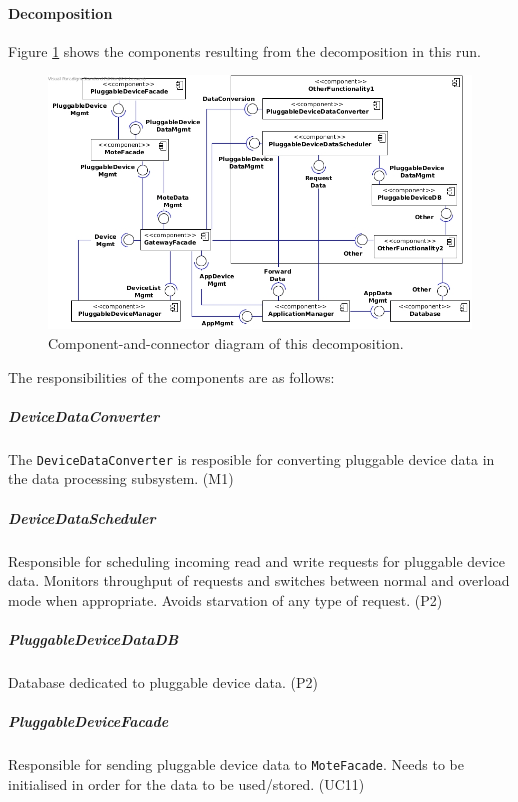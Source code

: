     \paragraph{Decomposition}
        Figure \ref{fig:it2-cc_main} shows the components resulting from the
        decomposition in this run.

        \begin{figure}[!h]
        	\centering
            \includegraphics[width=1\textwidth]{images/component-diagram-2}
        	\caption{Component-and-connector diagram of this decomposition.}
            \label{fig:it2-cc_main}
        \end{figure}

        The responsibilities of the components are as follows:

    \subparagraph{DeviceDataConverter}
        The \texttt{DeviceDataConverter} is resposible for converting
        pluggable device data in the data processing subsystem. (M1)

    \subparagraph{DeviceDataScheduler}
        Responsible for scheduling incoming read and write requests for
        pluggable device data. Monitors throughput of requests and switches
        between normal and overload mode when appropriate. Avoids starvation
        of any type of request. (P2)

    \subparagraph{PluggableDeviceDataDB}
        Database dedicated to pluggable device data. (P2)

    \subparagraph{PluggableDeviceFacade}
        Responsible for sending pluggable device data to \texttt{MoteFacade}.
        Needs to be initialised in order for the data to be used/stored. (UC11)


